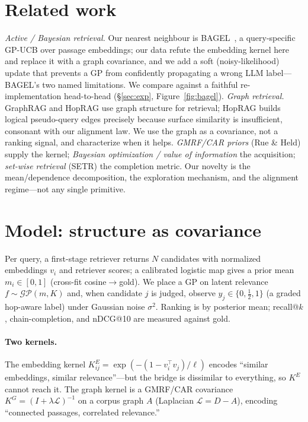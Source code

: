 \documentclass[11pt]{article}
\theoremstyle{plain}\newtheorem{theorem}{Theorem}\newtheorem{lemma}{Lemma}\newtheorem{proposition}{Proposition}
\theoremstyle{definition}\newtheorem{assumption}{Assumption}\newtheorem{remark}{Remark}
\newcommand{\GP}{\mathcal{GP}}
\begin{document}
\section{Related work}\label{sec:rel}
\emph{Active / Bayesian retrieval.} Our nearest neighbour is BAGEL~\citep{bagel2026}, a query-specific GP-UCB over
passage embeddings; our data refute the embedding kernel here and replace it with a graph covariance, and we add a
soft (noisy-likelihood) update that prevents a GP from confidently propagating a wrong LLM label---BAGEL's two named
limitations. We compare against a faithful re-implementation head-to-head (\S\ref{sec:exp}, Figure~\ref{fig:bagel}). \emph{Graph retrieval.} GraphRAG and HopRAG use graph structure for retrieval; HopRAG builds logical
pseudo-query edges precisely because surface similarity is insufficient, consonant with our alignment law. We use
the graph as a covariance, not a ranking signal, and characterize when it helps. \emph{GMRF/CAR priors} (Rue \&
Held) supply the kernel; \emph{Bayesian optimization / value of information} the acquisition; \emph{set-wise
retrieval} (SETR) the completion metric. Our novelty is the mean/dependence decomposition, the exploration
mechanism, and the alignment regime---not any single primitive.

\section{Model: structure as covariance}\label{sec:model}
Per query, a first-stage retriever returns $N$ candidates with normalized embeddings $v_i$ and retriever scores;
a calibrated logistic map gives a prior mean $m_i\in[0,1]$ (cross-fit cosine$\to$gold). We place a GP on latent
relevance $f\sim\GP(m,K)$ and, when candidate $j$ is judged, observe $y_j\in\{0,\tfrac12,1\}$ (a graded hop-aware
label) under Gaussian noise $\sigma^2$. Ranking is by posterior mean; recall@$k$, chain-completion, and nDCG@10
are measured against gold.

\paragraph{Two kernels.} The embedding kernel $K^E_{ij}=\exp(-(1-v_i^\top v_j)/\ell)$ encodes ``similar
embeddings, similar relevance''---but the bridge is dissimilar to everything, so $K^E$ cannot reach it. The graph
kernel is a GMRF/CAR covariance $K^G=(I+\lambda \mathcal L)^{-1}$ on a corpus graph $A$ (Laplacian
$\mathcal L=D-A$), encoding ``connected passages, correlated relevance.''
\end{document}
